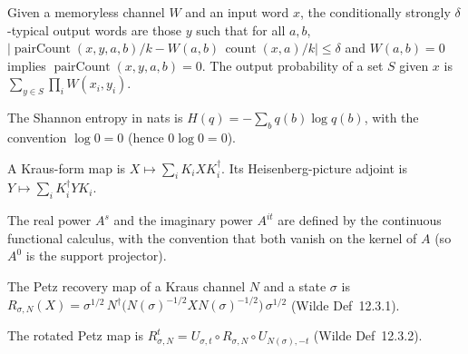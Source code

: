 \begin{definition}
  \label{def:condTypical}
  Given a memoryless channel $W$ and an input word $x$, the conditionally
  strongly $\delta$-typical output words are those $y$ such that for all
  $a,b$,
  $\bigl|\operatorname{pairCount}(x,y,a,b)/k - W(a,b)\,\operatorname{count}(x,a)/k\bigr| \le \delta$
  and $W(a,b)=0$ implies $\operatorname{pairCount}(x,y,a,b)=0$. The output
  probability of a set $S$ given $x$ is $\sum_{y \in S} \prod_i W(x_i,y_i)$.
\end{definition}

\begin{definition}
  \label{def:entropy}
  The Shannon entropy in nats is $H(q) = -\sum_b q(b)\log q(b)$, with the
  convention $\log 0 = 0$ (hence $0\log 0 = 0$).
\end{definition}

\begin{definition}
  \label{def:kraus}
  A Kraus-form map is $X \mapsto \sum_i K_i X K_i^\dagger$. Its Heisenberg-picture
  adjoint is $Y \mapsto \sum_i K_i^\dagger Y K_i$.
\end{definition}

\begin{definition}
  \label{def:rpowS}
  The real power $A^s$ and the imaginary power $A^{it}$ are defined by the
  continuous functional calculus, with the convention that both vanish on the
  kernel of $A$ (so $A^0$ is the support projector).
\end{definition}

\begin{definition}
  \label{def:petz}
  The Petz recovery map of a Kraus channel $N$ and a state $\sigma$ is
  $R_{\sigma,N}(X)
    = \sigma^{1/2}\,
      N^\dagger\bigl(N(\sigma)^{-1/2} X N(\sigma)^{-1/2}\bigr)\,
      \sigma^{1/2}$
  (Wilde Def~12.3.1).
\end{definition}

\begin{definition}
  \label{def:rotatedPetz}
  The rotated Petz map is
  $R^t_{\sigma,N}
    = U_{\sigma,t} \circ R_{\sigma,N} \circ U_{N(\sigma),-t}$
  (Wilde Def~12.3.2).
\end{definition}

